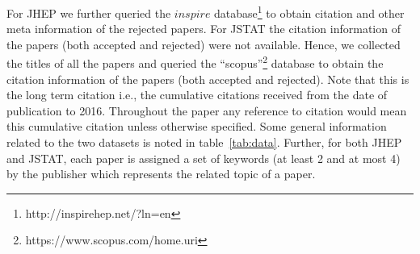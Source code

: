  For JHEP we further queried the $inspire$ database\footnote{http://inspirehep.net/?ln=en} to obtain citation and other meta information 
of the rejected papers.  
For JSTAT the citation information of the papers (both accepted and rejected) were not available. Hence, we collected the titles of all the papers and queried the ``scopus''\footnote{https://www.scopus.com/home.uri}
database to obtain the citation information of the papers (both accepted and rejected). 
Note that this is the long term citation i.e., the cumulative citations received from the date of publication to 2016. Throughout the paper any reference to citation 
would mean this cumulative citation unless otherwise specified.
Some general information related to the two datasets is noted in table~\ref{tab:data}.
Further, for both JHEP and JSTAT, each paper is assigned a set of keywords (at least 2 and at most 4) by the publisher which represents the related topic of a paper. 

